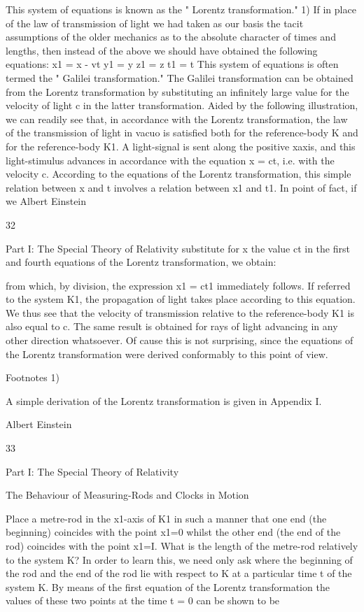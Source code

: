 \documentclass{article}
\begin{document}
This system of equations is known as the " Lorentz transformation." 1)
If in place of the law of transmission of light we had taken as our basis the tacit
assumptions of the older mechanics as to the absolute character of times and lengths, then
instead of the above we should have obtained the following equations:
x1 = x - vt
y1 = y
z1 = z
t1 = t
This system of equations is often termed the " Galilei transformation." The Galilei
transformation can be obtained from the Lorentz transformation by substituting an infinitely
large value for the velocity of light c in the latter transformation.
Aided by the following illustration, we can readily see that, in accordance with the
Lorentz transformation, the law of the transmission of light in vacuo is satisfied both for the
reference-body K and for the reference-body K1. A light-signal is sent along the positive xaxis, and this light-stimulus advances in accordance with the equation
x = ct,
i.e. with the velocity c. According to the equations of the Lorentz transformation, this
simple relation between x and t involves a relation between x1 and t1. In point of fact, if we
Albert Einstein

32

Part I: The Special Theory of Relativity
substitute for x the value ct in the first and fourth equations of the Lorentz transformation,
we obtain:

from which, by division, the expression
x1 = ct1
immediately follows. If referred to the system K1, the propagation of light takes place
according to this equation. We thus see that the velocity of transmission relative to the
reference-body K1 is also equal to c. The same result is obtained for rays of light advancing
in any other direction whatsoever. Of cause this is not surprising, since the equations of the
Lorentz transformation were derived conformably to this point of view.

Footnotes
1)

A simple derivation of the Lorentz transformation is given in Appendix I.

Albert Einstein

33

Part I: The Special Theory of Relativity

The Behaviour of Measuring-Rods
and Clocks in Motion

Place a metre-rod in the x1-axis of K1 in such a manner that one end (the beginning)
coincides with the point x1=0 whilst the other end (the end of the rod) coincides with the
point x1=I. What is the length of the metre-rod relatively to the system K? In order to learn
this, we need only ask where the beginning of the rod and the end of the rod lie with respect
to K at a particular time t of the system K. By means of the first equation of the Lorentz
transformation the values of these two points at the time t = 0 can be shown to be
\end{document}
